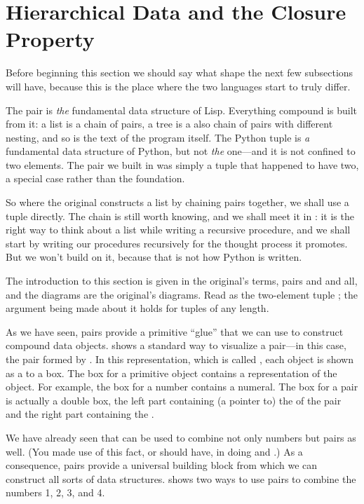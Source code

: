 \section{Hierarchical Data and the Closure Property}
\label{Section 2.2}

\noindent
Before beginning this section we should say what shape the next few subsections will have,
because this is the place where the two languages start to truly differ.

The pair is \emph{the} fundamental data structure of Lisp.  Everything compound
is built from it: a list is a chain of pairs, a tree is a also chain of pairs
with different nesting, and so is the text of the program itself.  The Python tuple is \emph{a} fundamental data
structure of Python, but not \emph{the} one---and it is not confined to two
elements.  The pair we built in  was simply a tuple that
happened to have two, a special case rather than the foundation.

So where the original constructs a list by chaining pairs together, we shall use
a tuple directly.  The chain is still worth knowing, and we shall meet it in
: it is the right way to think about a list while writing a
recursive procedure, and we shall start by writing our procedures recursively for the
thought process it promotes.  But we won't build on it, because that is not how Python
is written.

The introduction to this section is given in the original's terms, pairs and  and
all, and the diagrams are the original's diagrams.  Read  as the
two-element tuple ; the argument being made about it holds for
tuples of any length.

As we have seen, pairs provide a primitive ``glue'' that we can use to
construct compound data objects.   shows a standard way to
visualize a pair---in this case, the pair formed by .  In this
representation, which is called , each object
is shown as a  to a box.  The box for a primitive object
contains a representation of the object.  For example, the box for a number
contains a numeral.  The box for a pair is actually a double box, the left part
containing (a pointer to) the  of the pair and the right part
containing the .

We have already seen that  can be used to combine not only numbers
but pairs as well.  (You made use of this fact, or should have, in doing
 and .)  As a consequence, pairs provide a
universal building block from which we can construct all sorts of data
structures.   shows two ways to use pairs to combine the
numbers 1, 2, 3, and 4.


